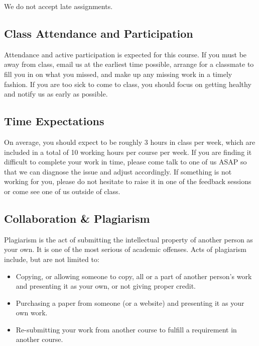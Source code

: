 \documentclass[
]{article}
\begin{document}
We do not accept late assignments.

\hypertarget{class-attendance-and-participation}{%
\subsection*{Class Attendance and Participation}\label{class-attendance-and-participation}}

Attendance and active participation is expected for this course. If you must be away from class, email us at the earliest time possible, arrange for a classmate to fill you in on what you missed, and make up any missing work in a timely fashion. If you are too sick to come to class, you should focus on getting healthy and notify us as early as possible.

\hypertarget{time-expectations}{%
\subsection*{Time Expectations}\label{time-expectations}}

On average, you should expect to be roughly 3 hours in class per week, which are included in a total of 10 working hours per course per week. If you are finding it difficult to complete your work in time, please come talk to one of us ASAP so that we can diagnose the issue and adjust accordingly. If something is not working for you, please do not hesitate to raise it in one of the feedback sessions or come see one of us outside of class.

\hypertarget{collaboration-plagiarism}{%
\subsection*{Collaboration \& Plagiarism}\label{collaboration-plagiarism}}

Plagiarism is the act of submitting the intellectual property of another person as your own. It is one of the most serious of academic offenses. Acts of plagiarism include, but are not limited to:

\begin{itemize}
\item
  Copying, or allowing someone to copy, all or a part of another person's work and presenting it as your own, or not giving proper credit.
\item
  Purchasing a paper from someone (or a website) and presenting it as your own work.
\item
  Re-submitting your work from another course to fulfill a requirement in another course.
\end{itemize}
\end{document}
